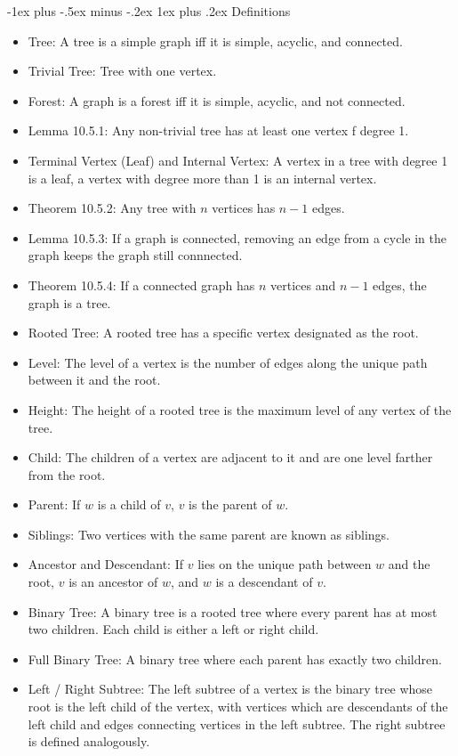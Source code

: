 \documentclass[10pt, portrait]{article}
\makeatletter
\renewcommand{\subsection}{\@startsection{subsection}{3}{0mm}%
                                {-1ex plus -.5ex minus -.2ex}%
                                {1ex plus .2ex}%
                                {\normalfont\small\bfseries}}%
\makeatother
\begin{document}
\begin{multicols*}{2}
\subsection{Definitions}
\begin{itemize}
    \item Tree: A tree is a simple graph iff it is simple, acyclic, and connected.
    \item Trivial Tree: Tree with one vertex.
    \item Forest: A graph is a forest iff it is simple, acyclic, and not connected.
    \item Lemma 10.5.1: Any non-trivial tree has at least one vertex f degree 1.
    \item Terminal Vertex (Leaf) and Internal Vertex: A vertex in a tree with degree 1 is a leaf, a vertex with degree more than 1 is an internal vertex.
    \item Theorem 10.5.2: Any tree with $n$ vertices has $n-1$ edges.
    \item Lemma 10.5.3: If a graph is connected, removing an edge from a cycle in the graph keeps the graph still connnected.
    \item Theorem 10.5.4: If a connected graph has $n$ vertices and $n-1$ edges, the graph is a tree.
    \item Rooted Tree: A rooted tree has a specific vertex designated as the root.
    \item Level: The level of a vertex is the number of edges along the unique path between it and the root.
    \item Height: The height of a rooted tree is the maximum level of any vertex of the tree.
    \item Child: The children of a vertex are adjacent to it and are one level farther from the root.
    \item Parent: If $w$ is a child of $v$, $v$ is the parent of $w$.
    \item Siblings: Two vertices with the same parent are known as siblings.
    \item Ancestor and Descendant: If $v$ lies on the unique path between $w$ and the root, $v$ is an ancestor of $w$, and $w$ is a descendant of $v$.
    \item Binary Tree: A binary tree is a rooted tree where every parent has at most two children. Each child is either a left or right child.
    \item Full Binary Tree: A binary tree where each parent has exactly two children.
    \item Left / Right Subtree: The left subtree of a vertex is the binary tree whose root is the left child of the vertex, with vertices which are descendants of the left child and edges connecting vertices in the left subtree. The right subtree is defined analogously.

\end{itemize}
\end{multicols*}
\end{document}
